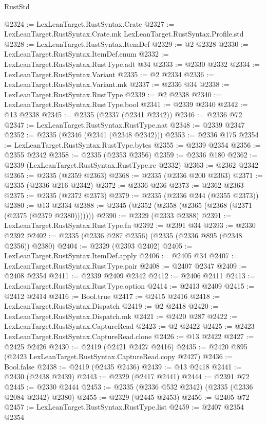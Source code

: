 \begin{lexlean}{RustStd}
\begin{coremodule}
@2324 := LexLeanTarget.RustSyntax.Crate
@2327 := LexLeanTarget.RustSyntax.Crate.mk LexLeanTarget.RustSyntax.Profile.std
@2328 := LexLeanTarget.RustSyntax.ItemDef
@2329 := @2 @2328
@2330 := LexLeanTarget.RustSyntax.ItemDef.enum
@2332 := LexLeanTarget.RustSyntax.RustType.adt @34
@2333 := @2330 @2332
@2334 := LexLeanTarget.RustSyntax.Variant
@2335 := @2 @2334
@2336 := LexLeanTarget.RustSyntax.Variant.mk
@2337 := @2336 @34
@2338 := LexLeanTarget.RustSyntax.RustType
@2339 := @2 @2338
@2340 := LexLeanTarget.RustSyntax.RustType.bool
@2341 := @2339 @2340
@2342 := @13 @2338
@2345 := @2335 (@2337 (@2341 @2342))
@2346 := @2336 @72
@2347 := LexLeanTarget.RustSyntax.RustType.nat
@2348 := @2339 @2347
@2352 := @2335 (@2346 (@2341 (@2348 @2342)))
@2353 := @2336 @175
@2354 := LexLeanTarget.RustSyntax.RustType.bytes
@2355 := @2339 @2354
@2356 := @2355 @2342
@2358 := @2335 (@2353 @2356)
@2359 := @2336 @180
@2362 := @2339 (LexLeanTarget.RustSyntax.RustType.rc @2332)
@2363 := @2362 @2342
@2365 := @2335 (@2359 @2363)
@2368 := @2335 (@2336 @200 @2363)
@2371 := @2335 (@2336 @216 @2342)
@2372 := @2336 @236
@2373 := @2362 @2363
@2375 := @2335 (@2372 @2373)
@2379 := @2335 (@2336 @244 (@2355 @2373))
@2380 := @13 @2334
@2388 := @2345 (@2352 (@2358 (@2365 (@2368 (@2371 (@2375 (@2379 @2380)))))))
@2390 := @2329 (@2333 @2388)
@2391 := LexLeanTarget.RustSyntax.RustType.fn
@2392 := @2391 @34
@2393 := @2330 @2392
@2402 := @2335 (@2336 @287 @2356) (@2335 (@2336 @895 (@2348 @2356)) @2380)
@2404 := @2329 (@2393 @2402)
@2405 := LexLeanTarget.RustSyntax.ItemDef.apply
@2406 := @2405 @34
@2407 := LexLeanTarget.RustSyntax.RustType.pair
@2408 := @2407 @2347
@2409 := @2408 @2354
@2411 := @2339 @2409 @2342
@2412 := @2406 @2411
@2413 := LexLeanTarget.RustSyntax.RustType.option
@2414 := @2413 @2409
@2415 := @2412 @2414
@2416 := Bool.true
@2417 := @2415 @2416
@2418 := LexLeanTarget.RustSyntax.Dispatch
@2419 := @2 @2418
@2420 := LexLeanTarget.RustSyntax.Dispatch.mk
@2421 := @2420 @287
@2422 := LexLeanTarget.RustSyntax.CaptureRead
@2423 := @2 @2422
@2425 := @2423 LexLeanTarget.RustSyntax.CaptureRead.clone
@2426 := @13 @2422
@2427 := @2425 @2426
@2430 := @2419 (@2421 @2427 @2416)
@2435 := @2420 @895 (@2423 LexLeanTarget.RustSyntax.CaptureRead.copy @2427)
@2436 := Bool.false
@2438 := @2419 (@2435 @2436)
@2439 := @13 @2418
@2441 := @2430 (@2438 @2439)
@2443 := @2329 (@2417 @2441)
@2444 := @2391 @72
@2445 := @2330 @2444
@2453 := @2335 (@2336 @532 @2342) (@2335 (@2336 @2084 @2342) @2380)
@2455 := @2329 (@2445 @2453)
@2456 := @2405 @72
@2457 := LexLeanTarget.RustSyntax.RustType.list
@2459 := @2407 @2354 @2354

\end{coremodule}
\end{lexlean}
